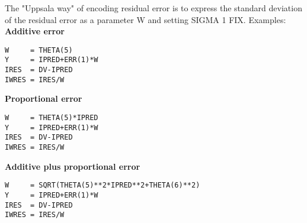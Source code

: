 The "Uppsala way" of encoding residual error 
is to express the standard deviation of the residual error as a parameter W and setting SIGMA 1 FIX. Examples:\\
{\bf Additive error} 
\begin{verbatim}
W     = THETA(5)
Y     = IPRED+ERR(1)*W
IRES  = DV-IPRED
IWRES = IRES/W
\end{verbatim}
{\bf Proportional error}
\begin{verbatim}
W     = THETA(5)*IPRED
Y     = IPRED+ERR(1)*W
IRES  = DV-IPRED
IWRES = IRES/W
\end{verbatim}
{\bf Additive plus proportional error}
\begin{verbatim}
W     = SQRT(THETA(5)**2*IPRED**2+THETA(6)**2)
Y     = IPRED+ERR(1)*W
IRES  = DV-IPRED
IWRES = IRES/W
\end{verbatim}

